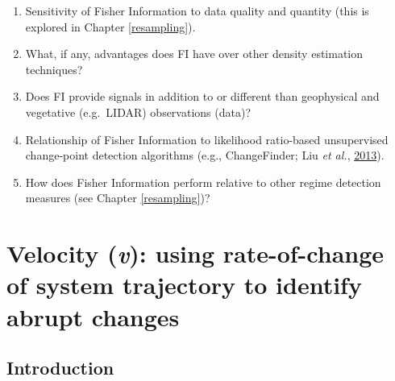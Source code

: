 \documentclass[12pt,twoside,openany]{reedthesis}
\providecommand{\tightlist}{%
  \setlength{\itemsep}{0pt}\setlength{\parskip}{0pt}}
\begin{document}
\begin{enumerate}
\def\labelenumi{\arabic{enumi}.}
\tightlist
\item
  Sensitivity of Fisher Information to data quality and quantity (this is explored in Chapter \ref{resampling}).
\item
  What, if any, advantages does FI have over other density estimation techniques?
\item
  Does FI provide signals in addition to or different than geophysical and vegetative (e.g.~LIDAR) observations (data)?
\item
  Relationship of Fisher Information to likelihood ratio-based unsupervised change-point detection algorithms (e.g., ChangeFinder; Liu \emph{et al.}, \protect\hyperlink{ref-liu2013change}{2013}).
\item
  How does Fisher Information perform relative to other regime detection measures (see Chapter \ref{resampling})?
\end{enumerate}
\hypertarget{velocity}{%
\chapter{\texorpdfstring{Velocity (\emph{v}): using rate-of-change of system trajectory to identify abrupt changes}{Velocity (v): using rate-of-change of system trajectory to identify abrupt changes}}\label{velocity}}

\hypertarget{introduction-3}{%
\section{Introduction}\label{introduction-3}}
\end{document}
